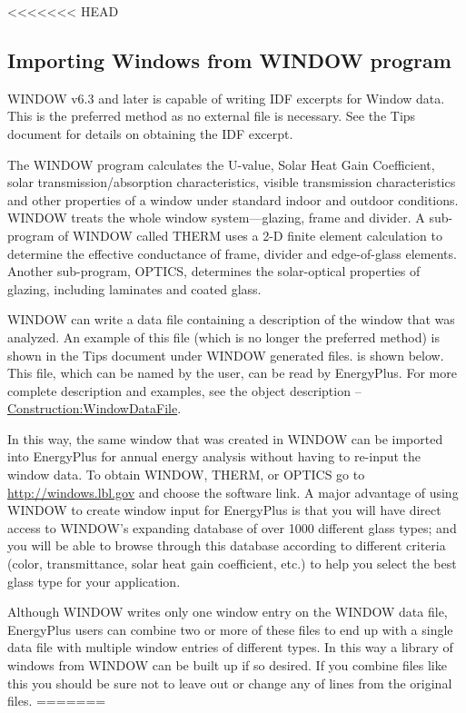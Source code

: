 <<<<<<< HEAD
\subsection{Importing Windows from WINDOW program}\label{importing-windows-from-window-program}

\begin{callout}
WINDOW v6.3 and later is capable of writing IDF excerpts for Window data. This is the preferred method as no external file is necessary. See the Tips document for details on obtaining the IDF excerpt.
\end{callout}

The WINDOW program calculates the U-value, Solar Heat Gain Coefficient, solar transmission/absorption characteristics, visible transmission characteristics and other properties of a window under standard indoor and outdoor conditions. WINDOW treats the whole window system---glazing, frame and divider. A sub-program of WINDOW called THERM uses a 2-D finite element calculation to determine the effective conductance of frame, divider and edge-of-glass elements. Another sub-program, OPTICS, determines the solar-optical properties of glazing, including laminates and coated glass.

WINDOW can write a data file containing a description of the window that was analyzed. An example of this file (which is no longer the preferred method) is shown in the Tips document under WINDOW generated files. is shown below. This file, which can be named by the user, can be read by EnergyPlus. For more complete description and examples, see the object description -- \hyperref[constructionwindowdatafile]{Construction:WindowDataFile}.

In this way, the same window that was created in WINDOW can be imported into EnergyPlus for annual energy analysis without having to re-input the window data. To obtain WINDOW, THERM, or OPTICS go to \url{http://windows.lbl.gov} and choose the software link. A major advantage of using WINDOW to create window input for EnergyPlus is that you will have direct access to WINDOW's expanding database of over 1000 different glass types; and you will be able to browse through this database according to different criteria (color, transmittance, solar heat gain coefficient, etc.) to help you select the best glass type for your application.

Although WINDOW writes only one window entry on the WINDOW data file, EnergyPlus users can combine two or more of these files to end up with a single data file with multiple window entries of different types. In this way a library of windows from WINDOW can be built up if so desired. If you combine files like this you should be sure not to leave out or change any of lines from the original files.
=======
